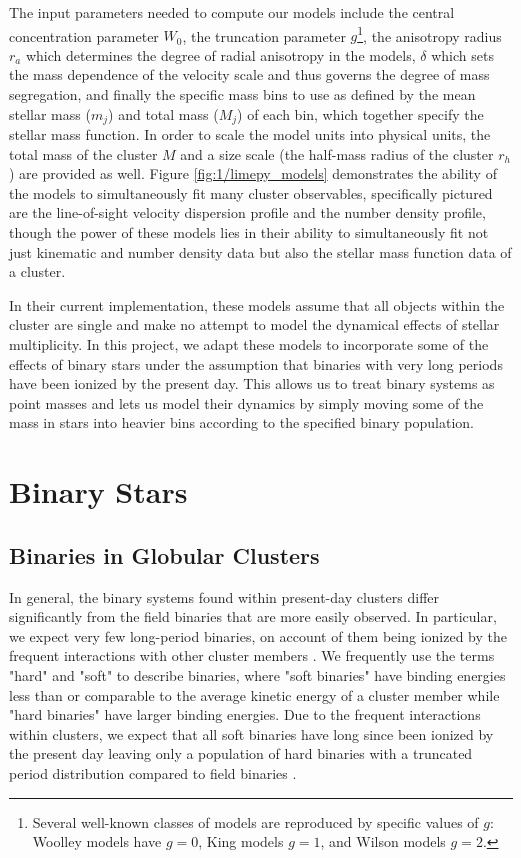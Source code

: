 The input parameters needed to compute our models include the central concentration parameter $W_0$,
the truncation parameter $g$\footnote{Several well-known classes of models are reproduced by
	specific values of $g$: Woolley models \citep{Woolley1954} have $g=0$, King models \citep{King1966}
	$g=1$, and Wilson models \citep{Wilson1975} $g=2$.}, the anisotropy radius $r_a$ which determines
the degree of radial anisotropy in the models, $\delta$ which sets the mass dependence of the
velocity scale and thus governs the degree of mass segregation, and finally the specific mass bins
to use as defined by the mean stellar mass ($m_j$) and total mass ($M_j$) of each bin, which
together specify the stellar mass function. In order to scale the model units into physical units,
the total mass of the cluster $M$ and a size scale (the half-mass radius of the cluster $r_h$) are
provided as well. Figure \ref{fig:1/limepy_models} demonstrates the ability of the models to
simultaneously fit many cluster observables, specifically pictured are the line-of-sight velocity
dispersion profile and the number density profile, though the power of these models lies in their
ability to simultaneously fit not just kinematic and number density data but also the stellar mass
function data of a cluster.


In their current implementation, these models assume that all objects within the cluster are single
and make no attempt to model the dynamical effects of stellar multiplicity. In this project, we
adapt these models to incorporate some of the effects of binary stars under the assumption that
binaries with very long periods have been ionized by the present day. This allows us to treat binary
systems as point masses and lets us model their dynamics by simply moving some of the mass in stars
into heavier bins according to the specified binary population.



\section{Binary Stars}
\subsection{Binaries in Globular Clusters}


In general, the binary systems found within present-day clusters differ significantly from the field
binaries that are more easily observed. In particular, we expect very few long-period binaries, on
account of them being ionized by the frequent interactions with other cluster members
\citep{Heggie2003}. We frequently use the terms "hard" and "soft" to describe binaries, where "soft
binaries" have binding energies less than or comparable to the average kinetic energy of a cluster
member while "hard binaries" have larger binding energies. Due to the frequent interactions within
clusters, we expect that all soft binaries have long since been ionized by the present day leaving
only a population of hard binaries with a truncated period distribution compared to field binaries
\citep{Heggie2003}.



